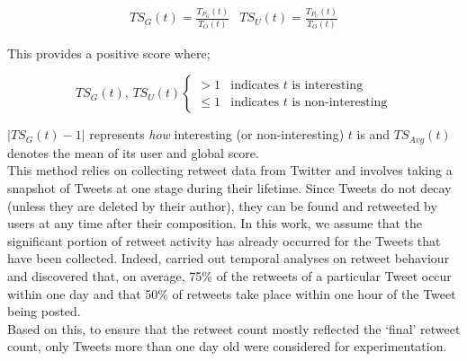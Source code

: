 \[
\begin{array}{cc}
 TS_G(t) = \frac{T_{P_G}(t)}{T_O(t)} &  TS_U(t) = \frac{T_{P_U}(t)}{T_O(t)} 
\end{array}
\]

This provides a positive score where;

\[
TS_G(t) \text{,  } TS_U(t)
	\begin{cases}
		> 1		&	\text{indicates } t	\text{ is interesting} \\
		\leq 1	&	\text{indicates } t	\text{ is non-interesting}
  \end{cases}
\]

$ | TS_G(t) - 1 | $ represents \textit{how} interesting (or non-interesting) $t$ is and $TS_{Avg}(t)$ denotes the mean of its user and global score.\\
This method relies on collecting retweet data from Twitter and involves taking a snapshot of Tweets at one stage during their lifetime. Since Tweets do not decay (unless they are deleted by their author), they can be found and retweeted by users at any time after their composition. In this work, we assume that the significant portion of retweet activity has already occurred for the Tweets that have been collected. Indeed, \cite{kwak10} carried out temporal analyses on retweet behaviour and discovered that, on average, 75\% of the retweets of a particular Tweet occur within one day and that 50\% of retweets take place within one hour of the Tweet being posted.\\
Based on this, to ensure that the retweet count mostly reflected the `final' retweet count, only Tweets more than one day old were considered for experimentation.


